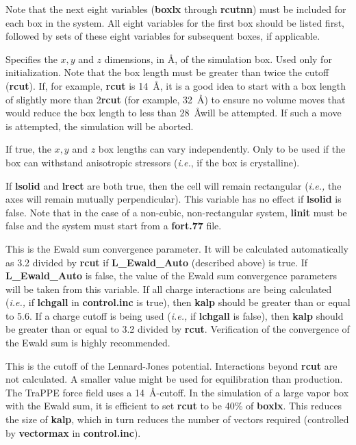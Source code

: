 \documentclass[12pt,letterpaper]{article}
\begin{document}
\noindent Note that the next eight variables ({\textbf{boxlx}} through {\textbf{rcutnn}}) must be included for each box in the system.  All eight variables for the first box should be listed first, followed by sets of these eight variables for subsequent boxes, if applicable.

 Specifies the $x, y$ and $z$
dimensions, in \AA, of the simulation box.  Used only for initialization.
Note that the box length must be greater than twice the cutoff ({\bf rcut}).  If, for example, {\bf rcut} is 14~\AA, it is a good idea to
start with a box length of slightly more than 2{\bf rcut} (for example, 32~\AA) to ensure no volume moves that would reduce the box
length to less than 28~\AA will be attempted.  If such a move is attempted, the simulation will be aborted.

 If true, the $x, y$ and $z$ box lengths can vary independently. 
Only to be used if the box can withstand anisotropic stressors ({\textit{i.e.}}, if the box is crystalline). 

 If {\textbf {lsolid}} and {\textbf{lrect}} are both true, then the cell will remain rectangular ({\textit{i.e.,}} the axes will remain mutually perpendicular).  This variable has no effect if {\textbf {lsolid}} is false.  
Note that in the case of a non-cubic, non-rectangular system, {\textbf{linit}} must be false and the system must start from a {\textbf{fort.77}} file.

 This is the Ewald sum convergence parameter.  
It will be calculated automatically as 3.2 divided by {\textbf{rcut}} 
if {\textbf{L\_Ewald\_Auto}} (described above) is true.
If {\textbf{L\_Ewald\_Auto}} is false, the value of the Ewald sum convergence parameters will be taken from this variable.
If all charge interactions are being calculated ({\textit{i.e.,}} if {\textbf {lchgall}} in {\textbf{control.inc}} is true), 
then {\textbf{kalp}} should be greater than or equal to 5.6.  
If a charge cutoff is being used ({\textit{i.e.,}} if {\textbf {lchgall}} is false), 
then {\textbf{kalp}} should be greater than or equal to 3.2 divided by {\textbf{rcut}}.
Verification of the convergence of the Ewald sum is highly recommended.


 This is the cutoff of the Lennard-Jones potential.  
Interactions beyond {\textbf{rcut}} are not calculated.
A smaller value might be used for equilibration than production.  
The TraPPE force field uses a 14~{\AA}-cutoff.
In the simulation of a large vapor box with the Ewald sum, it is efficient to set 
{\textbf{rcut}} to be 40\% of {\textbf{boxlx}}.  This reduces the size of {\textbf{kalp}},
which in turn reduces the number of vectors required (controlled by {\textbf{vectormax}}
in {\textbf{control.inc}}).
\end{document}
